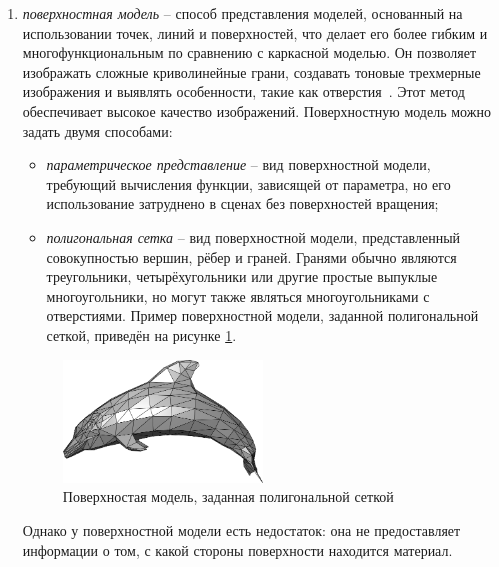 \begin{enumerate}
	\item \textit{поверхностная модель} -- способ представления моделей, основанный на использовании точек, линий и поверхностей, что делает его более гибким и многофункциональным по сравнению с каркасной моделью. Он позволяет изображать сложные криволинейные грани, создавать тоновые трехмерные изображения и выявлять особенности, такие как отверстия~\cite{lit1}. Этот метод обеспечивает высокое качество изображений. Поверхностную модель можно задать двумя способами:
	\begin{itemize}[label=--]
		\item \textit{параметрическое представление} -- вид поверхностной модели, требующий вычисления функции, зависящей от параметра, но его использование затруднено в сценах без поверхностей вращения;
		\item \textit{полигональная сетка} -- вид поверхностной модели, представленный совокупностью вершин, рёбер и граней. Гранями обычно являются треугольники, четырёхугольники или другие простые выпуклые многоугольники, но могут также являться многоугольниками с отверстиями. Пример поверхностной модели, заданной полигональной сеткой, приведён на рисунке \ref{fig:polygonal-models}.
	\end{itemize}
	\begin{figure}[h] 
		\centering
		\includegraphics[width=0.5\textwidth]{images/polygonal-models.png}
		\caption{Поверхностая модель, заданная полигональной сеткой} 
		\label{fig:polygonal-models} 
	\end{figure}
	Однако у поверхностной модели есть недостаток: она не предоставляет информации о том, с какой стороны поверхности находится материал.
	

\end{enumerate}
